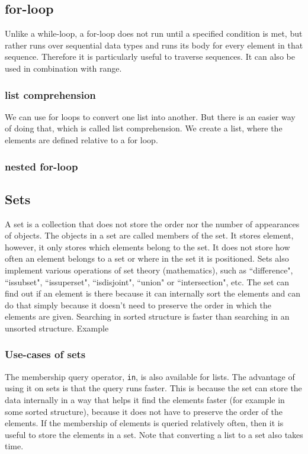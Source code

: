 \documentclass[10pt,a4paper]{article}
\begin{document}
\subsection{for-loop}
Unlike a while-loop, a for-loop does not run until a specified condition is met, but rather runs over sequential
data types and runs its body for every element in that sequence.  Therefore it is particularly useful to traverse
sequences.  It can also be used in combination with range.

\subsubsection{list comprehension}
\label{list_comprehension}
We can use for loops to convert one list into another. But there is an easier way of doing that, which is called list comprehension. We create a list, where the elements are defined relative to a for loop.

\subsubsection{nested for-loop}


\subsection{Sets}
A set is a collection that does not store the order nor the number of appearances of objects. The objects in a set are called members of the set.  It stores element, however, it only stores which elements belong to the set. It does not store how often an element belongs to a set or where in the set it is positioned. Sets also implement various operations of set theory (mathematics), such as ``difference", ``issubset", ``issuperset", ``isdisjoint", ``union" or ``intersection", etc. The set can find out if an element is there because it can internally sort the elements and can do that simply because it doesn't need to preserve the order in which the elements are given. Searching in sorted structure is faster than searching in an unsorted structure. Example

\subsubsection{Use-cases of sets}
The membership query operator, \texttt{in}, is also available for lists. The advantage of using it on sets is that the query runs faster. This is because the set can store the data internally in a way that helps it find the elements faster (for example in some sorted structure), because it does not have to preserve the order of the elements. If the membership of elements is queried relatively often, then it is useful to store the elements in a set. Note that converting a list to a set also takes time.
\end{document}
